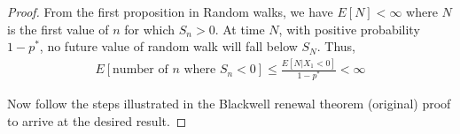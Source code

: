 \documentclass[a4paper,10pt,english]{article}
\begin{document}
\begin{proof}
From the first proposition in Random walks, we have $E[N] <\infty$ where $N$ is the first value of $n$ for which $S_n > 0$. At time $N$, with positive probability $1-p^*$, no future value of random walk will fall below $S_N$. Thus,
\begin{align*}E[\mbox{number of $n$ where $S_n < 0$}] \leq \frac{E[N|X_1<0]}{1-p^*} < \infty\end{align*}

Now follow the steps illustrated in the Blackwell renewal theorem (original) proof to arrive at the desired result.

\end{proof}
\end{document}
